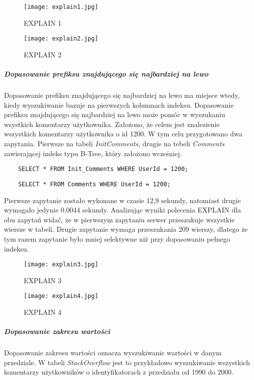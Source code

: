 \begin{figure}[h]
	\centering
    \texttt{[image: explain1.jpg]} 
    \caption{EXPLAIN 1}
    \label{fig::explain1.jpg}
\end{figure}

\begin{figure}[h]
	\centering
    \texttt{[image: explain2.jpg]} 
    \caption{EXPLAIN 2}
    \label{fig::explain2.jpg}
\end{figure}


\subparagraph{Dopasowanie prefiksu znajdującego się najbardziej na lewo}\mbox{} \newline
Dopasowanie prefiksu znajdującego się najbardziej na lewo ma miejsce wtedy, kiedy wyszukiwanie bazuje na pierwszych kolumnach indeksu.
Dopasowanie prefiksu znajdującego się najbardziej na lewo może pomóc w wyszukaniu wsystkich komentarzy użytkownika. Założono, że celem jest znalezienie wszystkich komentarzy użytkownika o id 1200.
W tym celu przygotowano dwa zapytania. Pierwsze na tabeli \textit{Init\textunderscore Comments}, drugie na tebeli \textit{Comments} zawierającej indeks typu B-Tree, który założono wcześniej.
\begin{verbatim}
    SELECT * FROM Init_Comments WHERE UserId = 1200;
\end{verbatim}
\begin{verbatim}
    SELECT * FROM Comments WHERE UserId = 1200;
\end{verbatim}
Pierwsze zapytanie zostało wykonane w czasie 12,9 sekundy, natomiast drugie wymagało jedynie 0,0044 sekundy. Analizując wyniki polecenia EXPLAIN dla obu zapytań widać, że w pierwszym zapytaniu serwer przeszukuje wszystkie wiersze w tabeli. Drugie zapytanie wymaga przeszukania 209 wierszy, dlatego że tym razem zapytanie było mniej selektywne niż przy dopasowaniu pełnego indeksu.
\begin{figure}[h]
	\centering
    \texttt{[image: explain3.jpg]} 
    \caption{EXPLAIN 3}
\end{figure}

\begin{figure}[h]
	\centering
    \texttt{[image: explain4.jpg]} 
    \caption{EXPLAIN 4}
\end{figure}

\subparagraph{Dopasowanie zakresu wartości}\mbox{} \newline
Dopasowanie zakresu wartości oznacza wyszukiwanie wartości w danym przedziale. W tabeli \textit{StackOverflow} jest to przykładowo wyszukiwanie wszystkich komentarzy użytkowników o identyfikatorach z przedziału od 1990 do 2000.

